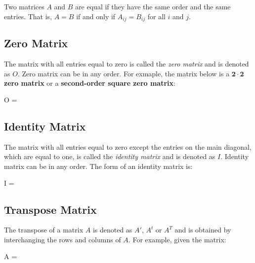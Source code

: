 \documentclass{report}
\begin{document}
\begin{multicols}{2}
  \doublespacing{}

  Two matrices $A$ and $B$ are equal if they have the same order and the same
  entries. That is, $A = B$ if and only if $A_{ij} = B_{ij}$ for all $i$ and $j$.

  \singlespacing{}

  \subsection*{Zero Matrix}

  \doublespacing{}

  The matrix with all entries equal to zero is called the \emph{zero matrix} and
  is denoted as $O$. Zero matrix can be in any order. For exmaple, the matrix
  below is a \textbf{$\mathbf{2 \cdot 2}$ zero matrix} or a \textbf{second-order
    square zero matrix}:
  \begin{cequation}
    O = 
  \end{cequation}

  \singlespacing{}

  \subsection*{Identity Matrix}

  \doublespacing{}

  The matrix with all entries equal to zero except the entries on the main
  diagonal, which are equal to one, is called the \emph{identity matrix} and is
  denoted as $I$. Identity matrix can be in any order. The form of an identity
  matrix is:
  \begin{cequation}
    I = 
  \end{cequation}

  \singlespacing{}

  \subsection*{Transpose Matrix}

  \doublespacing{}

  The transpose of a matrix $A$ is denoted as $A'$, $A^t$ or $A^T$ and is
  obtained by interchanging the rows and columns of $A$. For example, given the
  matrix:
  \begin{cequation}
    A = 
  \end{cequation}


\end{multicols}
\end{document}
